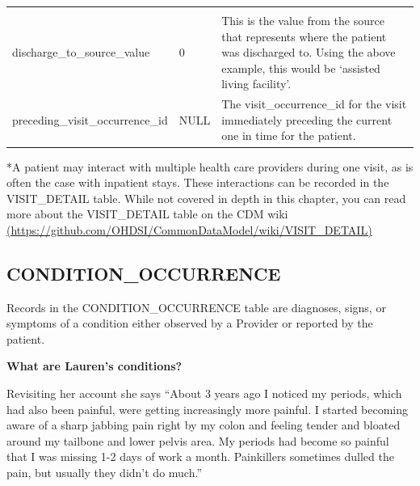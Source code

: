 \documentclass[]{book}
\begin{document}
\begin{longtable}[]{@{}lll@{}}
\begin{minipage}[t]{0.50\columnwidth}
\end{minipage}\tabularnewline
\begin{minipage}[t]{0.25\columnwidth}\raggedright
discharge\_to\_source\_value\strut
\end{minipage} & \begin{minipage}[t]{0.17\columnwidth}\raggedright
0\strut
\end{minipage} & \begin{minipage}[t]{0.50\columnwidth}\raggedright
This is the value from the source that represents where the patient was discharged to. Using the above example, this would be `assisted living facility'.\strut
\end{minipage}\tabularnewline
\begin{minipage}[t]{0.25\columnwidth}\raggedright
preceding\_visit\_occurrence\_id\strut
\end{minipage} & \begin{minipage}[t]{0.17\columnwidth}\raggedright
NULL\strut
\end{minipage} & \begin{minipage}[t]{0.50\columnwidth}\raggedright
The visit\_occurrence\_id for the visit immediately preceding the current one in time for the patient.\strut
\end{minipage}\tabularnewline
\bottomrule
\end{longtable}

*A patient may interact with multiple health care providers during one visit, as is often the case with inpatient stays. These interactions can be recorded in the VISIT\_DETAIL table. While not covered in depth in this chapter, you can read more about the VISIT\_DETAIL table on the CDM wiki \href{https://github.com/OHDSI/CommonDataModel/wiki/VISIT_DETAIL}{(https://github.com/OHDSI/CommonDataModel/wiki/VISIT\_DETAIL)}

\hypertarget{conditionOccurrence}{%
\subsection{CONDITION\_OCCURRENCE}\label{conditionOccurrence}}

Records in the CONDITION\_OCCURRENCE table are diagnoses, signs, or symptoms of a condition either observed by a Provider or reported by the patient.

\textbf{What are Lauren's conditions?}

Revisiting her account she says ``About 3 years ago I noticed my periods, which had also been
painful, were getting increasingly more painful. I started
becoming aware of a sharp jabbing pain right by my colon and
feeling tender and bloated around my tailbone and lower pelvis
area. My periods had become so painful that I was missing 1-2
days of work a month. Painkillers sometimes dulled the pain,
but usually they didn't do much.''
\end{document}
